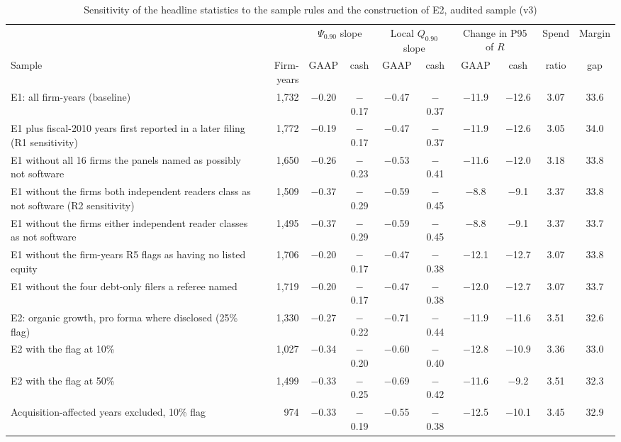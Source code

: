 \begin{table}[t]\centering\footnotesize\setlength{\tabcolsep}{3pt}
\caption{Sensitivity of the headline statistics to the sample rules and the construction of E2, audited sample (v3)}\label{tab:robust}
\begin{tabular}{@{}>{\raggedright\arraybackslash}p{5.4cm}rcccccccc@{}}\toprule
 & & \multicolumn{2}{c}{$\Psi_{0.90}$ slope} & \multicolumn{2}{c}{Local $Q_{0.90}$ slope} & \multicolumn{2}{c}{Change in P95 of $R$} & Spend & Margin\\\cmidrule(lr){3-4}\cmidrule(lr){5-6}\cmidrule(lr){7-8}
Sample & Firm-years & GAAP & cash & GAAP & cash & GAAP & cash & ratio & gap\\\midrule
E1: all firm-years (baseline) & 1{,}732 & $-$0.20 & $-$0.17 & $-$0.47 & $-$0.37 & $-$11.9 & $-$12.6 & 3.07 & 33.6 \\
E1 plus fiscal-2010 years first reported in a later filing (R1 sensitivity) & 1{,}772 & $-$0.19 & $-$0.17 & $-$0.47 & $-$0.37 & $-$11.9 & $-$12.6 & 3.05 & 34.0 \\
E1 without all 16 firms the panels named as possibly not software & 1{,}650 & $-$0.26 & $-$0.23 & $-$0.53 & $-$0.41 & $-$11.6 & $-$12.0 & 3.18 & 33.8 \\
E1 without the firms both independent readers class as not software (R2 sensitivity) & 1{,}509 & $-$0.37 & $-$0.29 & $-$0.59 & $-$0.45 & $-$8.8 & $-$9.1 & 3.37 & 33.8 \\
E1 without the firms either independent reader classes as not software & 1{,}495 & $-$0.37 & $-$0.29 & $-$0.59 & $-$0.45 & $-$8.8 & $-$9.1 & 3.37 & 33.7 \\
E1 without the firm-years R5 flags as having no listed equity & 1{,}706 & $-$0.20 & $-$0.17 & $-$0.47 & $-$0.38 & $-$12.1 & $-$12.7 & 3.07 & 33.8 \\
E1 without the four debt-only filers a referee named & 1{,}719 & $-$0.20 & $-$0.17 & $-$0.47 & $-$0.38 & $-$12.0 & $-$12.7 & 3.07 & 33.7 \\
E2: organic growth, pro forma where disclosed (25\% flag) & 1{,}330 & $-$0.27 & $-$0.22 & $-$0.71 & $-$0.44 & $-$11.9 & $-$11.6 & 3.51 & 32.6 \\
E2 with the flag at 10\% & 1{,}027 & $-$0.34 & $-$0.20 & $-$0.60 & $-$0.40 & $-$12.8 & $-$10.9 & 3.36 & 33.0 \\
E2 with the flag at 50\% & 1{,}499 & $-$0.33 & $-$0.25 & $-$0.69 & $-$0.42 & $-$11.6 & $-$9.2 & 3.51 & 32.3 \\
Acquisition-affected years excluded, 10\% flag & 974 & $-$0.33 & $-$0.19 & $-$0.55 & $-$0.38 & $-$12.5 & $-$10.1 & 3.45 & 32.9 \\

\end{tabular}
\end{table}
